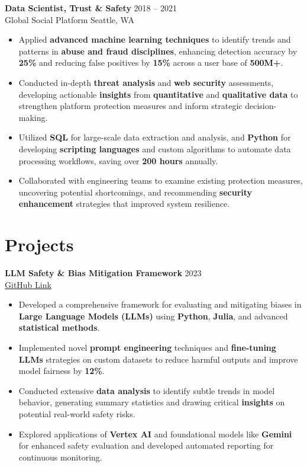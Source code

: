 \documentclass[11pt,a4paper]{article}
\begin{document}
\textbf{Data Scientist, Trust \& Safety} \hfill 2018 – 2021 \\
Global Social Platform \hfill Seattle, WA
\begin{itemize}
    \item Applied \textbf{advanced machine learning techniques} to identify trends and patterns in \textbf{abuse and fraud disciplines}, enhancing detection accuracy by \textbf{25\%} and reducing false positives by \textbf{15\%} across a user base of \textbf{500M+}.
    \item Conducted in-depth \textbf{threat analysis} and \textbf{web security} assessments, developing actionable \textbf{insights} from \textbf{quantitative} and \textbf{qualitative data} to strengthen platform protection measures and inform strategic decision-making.
    \item Utilized \textbf{SQL} for large-scale data extraction and analysis, and \textbf{Python} for developing \textbf{scripting languages} and custom algorithms to automate data processing workflows, saving over \textbf{200 hours} annually.
    \item Collaborated with engineering teams to examine existing protection measures, uncovering potential shortcomings, and recommending \textbf{security enhancement} strategies that improved system resilience.
\end{itemize}

\section*{Projects}
\textbf{LLM Safety \& Bias Mitigation Framework} \hfill 2023 \\
\href{https://github.com/johndoe/llm-safety-framework}{GitHub Link}
\begin{itemize}
    \item Developed a comprehensive framework for evaluating and mitigating biases in \textbf{Large Language Models (LLMs)} using \textbf{Python}, \textbf{Julia}, and advanced \textbf{statistical methods}.
    \item Implemented novel \textbf{prompt engineering} techniques and \textbf{fine-tuning LLMs} strategies on custom datasets to reduce harmful outputs and improve model fairness by \textbf{12\%}.
    \item Conducted extensive \textbf{data analysis} to identify subtle trends in model behavior, generating summary statistics and drawing critical \textbf{insights} on potential real-world safety risks.
    \item Explored applications of \textbf{Vertex AI} and foundational models like \textbf{Gemini} for enhanced safety evaluation and developed automated reporting for continuous monitoring.
\end{itemize}
\end{document}
